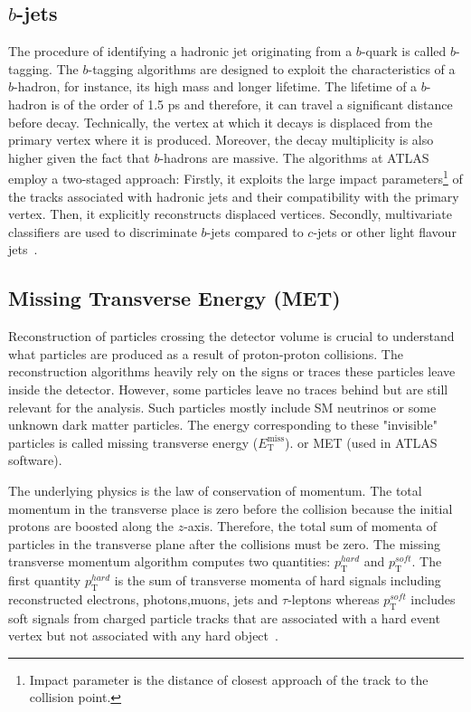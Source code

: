 \subsection*{$b$-jets}
The procedure of identifying a hadronic jet originating from a $b$-quark is called $b$-tagging.
The $b$-tagging algorithms are designed to exploit the characteristics of a $b$-hadron, for instance,
its high mass and longer lifetime. The lifetime of a $b$-hadron is of the order of 1.5 ps and 
therefore, it can travel a significant distance before decay. Technically, the vertex at which 
it decays is displaced from the primary vertex where it is produced. Moreover, the decay 
multiplicity is also higher given the fact that $b$-hadrons are massive. The algorithms at ATLAS
employ a two-staged approach: Firstly, it exploits the large impact 
parameters\footnote{Impact parameter is the distance of closest approach
of the track to the collision point.} of the tracks associated with hadronic jets
and their compatibility with the primary vertex. Then, it explicitly reconstructs displaced vertices.
Secondly, multivariate classifiers are used to discriminate $b$-jets compared to $c$-jets or other
light flavour jets~\cite{Aad:2682119}. 


\subsection{Missing Transverse Energy (MET)}
Reconstruction of particles crossing the detector volume is crucial to understand what particles
are produced as a result of proton-proton collisions. The reconstruction algorithms heavily rely on the
signs or traces these particles leave inside the detector. However, some particles leave no traces
behind but are still relevant for the analysis. Such particles mostly include SM neutrinos or some unknown dark matter
particles. The energy corresponding to these "invisible" particles is called missing transverse energy ($E_{\text{T}}^{\text{miss}}$).
or MET (used in ATLAS software).

The underlying physics is the law of conservation of momentum. The total momentum in the transverse place is zero before the collision because 
the initial protons are boosted along the $z$-axis. Therefore, the total sum of momenta of particles in the transverse plane after the collisions must be zero. 
The missing transverse momentum algorithm computes two quantities: $p_{\text{T}}^{hard}$ and $p_{\text{T}}^{soft}$. The first quantity $p_{\text{T}}^{hard}$ 
is the sum of transverse momenta of hard signals including reconstructed electrons, photons,muons, jets and $\tau$-leptons whereas $p_{\text{T}}^{soft}$ includes
soft signals from charged particle tracks that are associated with a hard event vertex but not associated with any hard object~\cite{ATLAS:2024cmj}. 

